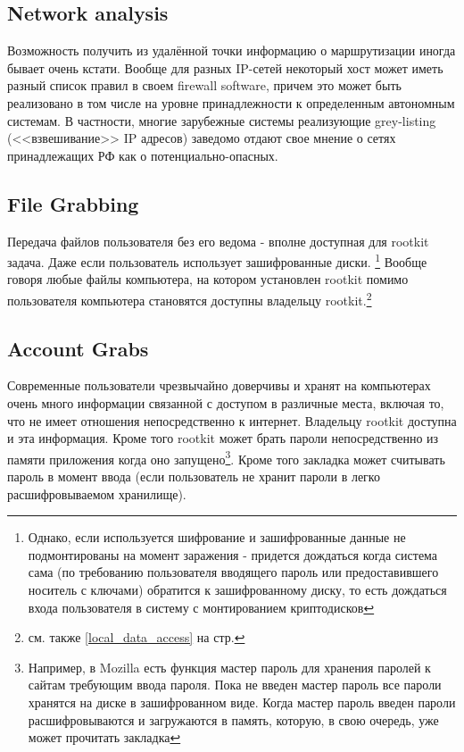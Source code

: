 \subsection{Network analysis}

Возможность получить из удалённой точки информацию о маршрутизации
иногда бывает очень кстати.  Вообще для разных IP-сетей некоторый
хост может иметь разный список правил в своем firewall software,
причем это может быть реализовано в том числе на уровне принадлежности
к определенным автономным системам. В частности, многие зарубежные
системы реализующие grey-listing (<<взвешивание>> IP адресов) заведомо
отдают свое мнение о сетях принадлежащих РФ как о потенциально-опасных.

\subsection{File Grabbing}

Передача файлов пользователя без его ведома - вполне доступная для
rootkit задача. Даже если пользователь использует зашифрованные диски.
\footnote{Однако, если используется шифрование и зашифрованные данные
не подмонтированы на момент заражения - придется дождаться когда
система сама (по требованию пользователя вводящего пароль или предоставившего
носитель с ключами) обратится к зашифрованному диску, то есть дождаться
входа пользователя в систему с монтированием криптодисков}
Вообще говоря любые файлы компьютера, на котором установлен rootkit
помимо пользователя компьютера становятся доступны владельцу
rootkit.\footnote{см. также \ref{local_data_access} на стр.
\pageref{local_data_access}}


\subsection{Account Grabs}

Современные пользователи чрезвычайно доверчивы и хранят на компьютерах
очень много информации связанной с доступом в различные места, включая
то, что не имеет отношения непосредственно к интернет. Владельцу rootkit
доступна и эта информация. Кроме того rootkit может брать пароли
непосредственно из памяти приложения когда оно запущено\footnote{Например,
в Mozilla есть функция мастер пароль для хранения паролей к сайтам требующим
ввода пароля. Пока не введен мастер пароль все пароли хранятся на диске в
зашифрованном виде. Когда мастер пароль введен пароли расшифровываются и
загружаются в память, которую, в свою очередь, уже может прочитать закладка}.
Кроме того закладка может считывать пароль в момент ввода (если пользователь
не хранит пароли в легко расшифровываемом хранилище).


